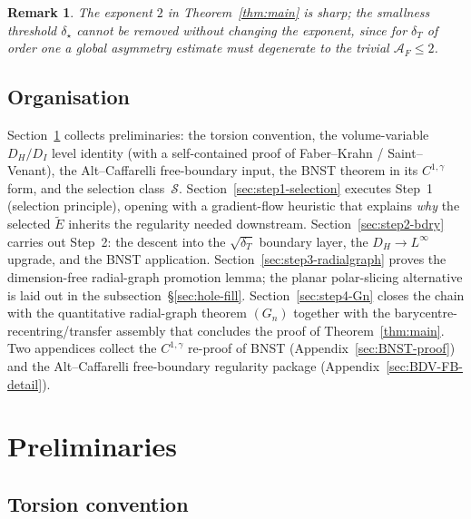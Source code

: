 \documentclass[11pt]{amsart}
\newtheorem{remark}[theorem]{Remark}
\newcommand{\dT}{\delta_T}
\newcommand{\AF}{\mathcal A_F}
\newcommand{\Etil}{\widetilde E}
\newcommand{\Sclass}{\mathcal S}
\begin{document}
\begin{remark}
The exponent $2$ in Theorem~\ref{thm:main} is sharp; the smallness
threshold $\delta_\star$ cannot be removed without changing the
exponent, since for $\dT$ of order one a global asymmetry estimate
must degenerate to the trivial $\AF\le 2$.
\end{remark}

\subsection*{Organisation}

Section~\ref{sec:prelim} collects preliminaries: the torsion
convention, the volume-variable $D_H/D_I$ level identity (with a
self-contained proof of Faber--Krahn / Saint--Venant), the
Alt--Caffarelli free-boundary input, the BNST theorem in its
$C^{1,\gamma}$ form, and the selection class~$\Sclass$.
Section~\ref{sec:step1-selection} executes Step~1 (selection
principle), opening with a gradient-flow heuristic that explains
\emph{why} the selected $\Etil$ inherits the regularity needed
downstream.  Section~\ref{sec:step2-bdry} carries out Step~2: the
descent into the $\sqrt{\dT}$ boundary layer, the $D_H\to L^\infty$
upgrade, and the BNST application.
Section~\ref{sec:step3-radialgraph} proves the dimension-free
radial-graph promotion lemma; the planar polar-slicing alternative is
laid out in the subsection~\S\ref{sec:hole-fill}.
Section~\ref{sec:step4-Gn} closes the chain with the quantitative
radial-graph theorem $(G_n)$ together with the
barycentre-recentring/transfer assembly that concludes the proof of
Theorem~\ref{thm:main}.  Two appendices collect the $C^{1,\gamma}$
re-proof of BNST (Appendix~\ref{sec:BNST-proof}) and the
Alt--Caffarelli free-boundary regularity package
(Appendix~\ref{sec:BDV-FB-detail}).

\section{Preliminaries}\label{sec:prelim}

\subsection{Torsion convention}
\end{document}
